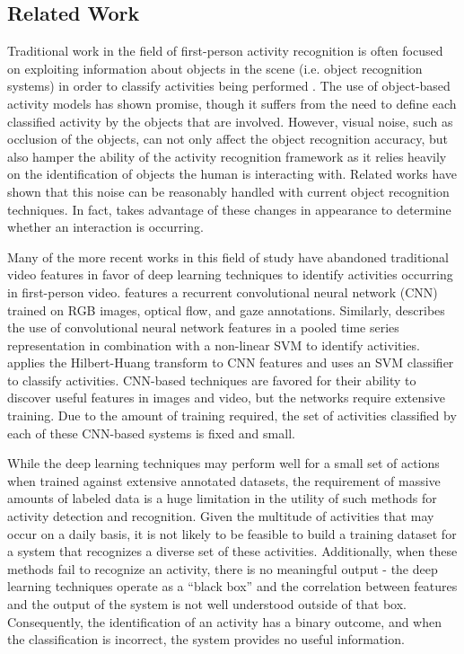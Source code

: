 \documentclass[12pt]{report}
\begin{document}
\subsection{Related Work}
Traditional work in the field of first-person activity recognition is often focused on exploiting information about objects in the scene (i.e. object recognition systems) in order to classify activities being performed \cite{Nakatani2019, McCandless2013, Pirsiavash2012, Sudhakaran2018, Wang2018}. The use of object-based activity models has shown promise, though it suffers from the need to define each classified activity by the objects that are involved. However, visual noise, such as occlusion of the objects, can not only affect the object recognition accuracy, but also hamper the ability of the activity recognition framework as it relies heavily on the identification of objects the human is interacting with. Related works have shown that this noise can be reasonably handled with current object recognition techniques. In fact, \cite{Pirsiavash2012} takes advantage of these changes in appearance to determine whether an interaction is occurring.

Many of the more recent works in this field of study have abandoned traditional video features in favor of deep learning techniques to identify activities occurring in first-person video.   \cite{Li} features a recurrent convolutional neural network (CNN) trained on RGB images, optical flow, and gaze annotations. Similarly, \cite{Ryoo2015} describes the use of convolutional neural network features in a pooled time series representation in combination with a non-linear SVM to identify activities. \cite{Purwanto2017} applies the Hilbert-Huang transform to CNN features and uses an SVM classifier to classify activities. CNN-based techniques are favored for their ability to discover useful features in images and video, but the networks require extensive training. Due to the amount of training required, the set of activities classified by each of these CNN-based systems is fixed and small.

While the deep learning techniques may perform well for a small set of actions when trained against extensive annotated datasets, the requirement of massive amounts of labeled data is a huge limitation in the utility of such methods for activity detection and recognition. Given the multitude of activities that may occur on a daily basis, it is not likely to be feasible to build a training dataset for a system that recognizes a diverse set of these activities. Additionally, when these methods fail to recognize an activity, there is no meaningful output - the deep learning techniques operate as a “black box” and the correlation between features and the output of the system is not well understood outside of that box. Consequently, the identification of an activity has a binary outcome, and when the classification is incorrect, the system provides no useful information.
\end{document}
